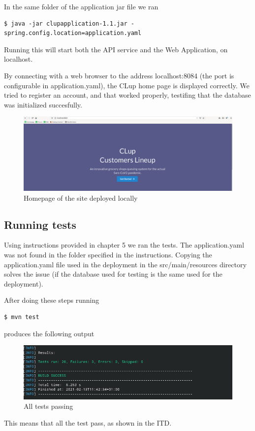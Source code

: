 In the same folder of the application jar file we ran
\begin{lstlisting}[columns=fullflexible]
    $ java -jar clupapplication-1.1.jar -spring.config.location=application.yaml
\end{lstlisting}

Running this will start both the API service and the Web Application, on localhost.

\clearpage
By connecting with a web browser to the address localhost:8084 (the port is configurable in application.yaml), the CLup home page is displayed correctly. We tried to register an account, and that worked properly, testifing that the database was initialized succesfully.
\begin{figure}[ht]
    \centering
    \includegraphics[width=\textwidth]{Images/deploy.jpg}
    \caption{\label{fig:Booked_Ticket_State}Homepage of the site deployed locally}
\end{figure}

\subsection{Running tests}
Using instructions provided in chapter 5 we ran the tests.
The application.yaml was not found in the folder specified in the instructions. Copying the application.yaml file used in the deployment in the src/main/resources directory solves the issue (if the database used for testing is the
same used for the deployment).

After doing these steps running
\begin{lstlisting}[columns=fullflexible]
    $ mvn test
\end{lstlisting}
produces the following output
\begin{figure}[H]
    \centering
    \includegraphics[width=\textwidth]{Images/test.jpg}
    \caption{\label{fig:Booked_Ticket_State}All tests passing}
\end{figure}
This means that all the test pass, as shown in the ITD.
